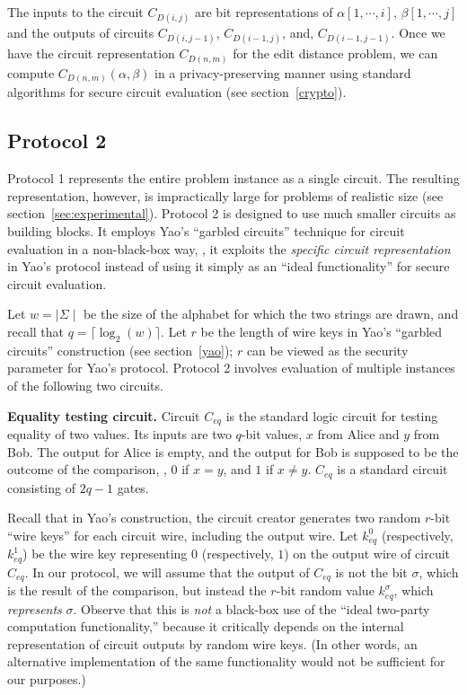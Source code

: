 The inputs to the circuit $C_{D(i,j)}$ are bit representations of
$\alpha[1,\cdots,i]$, $\beta[1,\cdots,j]$ and the outputs of circuits
$C_{D(i,j-1)}$, $C_{D(i-1,j)}$, and, $C_{D(i-1,j-1)}$.  Once we have
the circuit representation $C_{D(n,m)}$ for the edit distance problem,
we can compute $C_{D(n,m)}(\alpha,\beta)$ in a privacy-preserving
manner using standard algorithms for secure circuit evaluation (see
section~\ref{crypto}).


\subsection{Protocol 2}

Protocol 1 represents the entire problem instance as a single circuit.
The resulting representation, however, is impractically large for
problems of realistic size (see section~\ref{sec:experimental}).
Protocol 2 is designed to use much smaller circuits as building blocks.
It employs Yao's ``garbled circuits'' technique for circuit evaluation
in a non-black-box way, \ie, it exploits the \emph{specific circuit
representation} in Yao's protocol instead of using it simply as an
``ideal functionality'' for secure circuit evaluation.

Let $w=\mid \Sigma \mid$ be the size of the alphabet for which the two
strings are drawn, and recall that $q = \lceil \log_2 (w) \rceil$.
Let $r$ be the length of wire keys in Yao's ``garbled circuits''
construction (see section~\ref{yao}); $r$ can be viewed as the security
parameter for Yao's protocol.  Protocol 2 involves evaluation of multiple
instances of the following two circuits.

\newcommand{\CE}{C_{\mathit{eq}}}
\newcommand{\CM}{C_{\mathit{min3}}}

\vspace{1ex}
\noindent
\textbf{Equality testing circuit.}
Circuit $\CE$ is the standard logic circuit for testing equality of
two values.  Its inputs are two $q$-bit values, $x$ from Alice and $y$
from Bob.  The output for Alice is empty, and the output for Bob is
supposed to be the outcome of the comparison, \ie, $0$ if $x=y$, and $1$
if $x \neq y$. $\CE$ is a standard circuit consisting of $2q-1$ gates.

Recall that in Yao's construction, the circuit creator generates
two random $r$-bit ``wire keys'' for each circuit wire, including the
output wire.  Let $k^0_{\mathit{eq}}$ (respectively, $k^1_{\mathit{eq}}$)
be the wire key representing $0$ (respectively, $1$) on the output wire
of circuit $\CE$.  In our protocol, we will assume that the output of
$\CE$ is not the bit $\sigma$, which is the result of the comparison,
but instead the $r$-bit random value $k^{\sigma}_{\mathit{eq}}$, which
\emph{represents} $\sigma$.  Observe that this is \emph{not} a black-box
use of the ``ideal two-party computation functionality,'' because it
critically depends on the internal representation of circuit outputs
by random wire keys.  (In other words, an alternative implementation of
the same functionality would not be sufficient for our purposes.)

